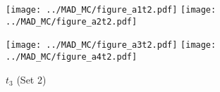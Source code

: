 \documentclass[a4paper, 11pt]{article}
\begin{document}
\begin{figure}[htbp]
\centering 
\par
{\footnotesize \psfragscanon
{   \texttt{[image: ../MAD\_MC/figure\_a1t2.pdf]}}
{   \texttt{[image: ../MAD\_MC/figure\_a2t2.pdf]}}
\newline
}
\par
{\footnotesize \psfragscanon
{   \texttt{[image: ../MAD\_MC/figure\_a3t2.pdf]}}
{   \texttt{[image: ../MAD\_MC/figure\_a4t2.pdf]}}
\newline
}
\caption{$t_3$ (Set 2)}
\label{fig:simulationsum}
\end{figure}





\newpage


\end{document}

